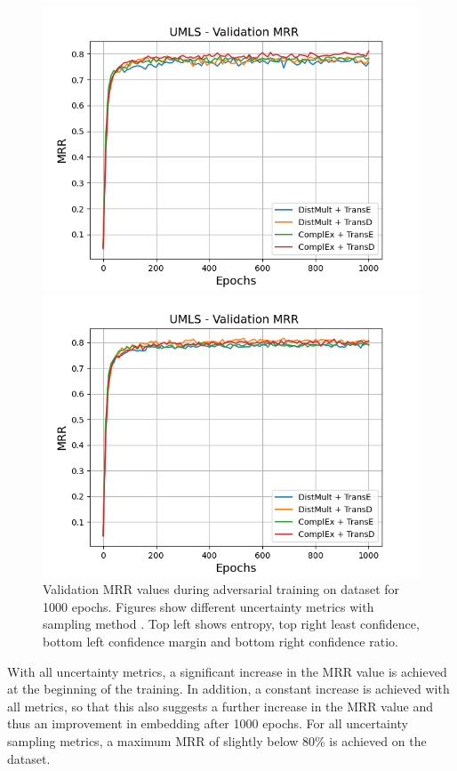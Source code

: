 \begin{figure}[H]
\begin{minipage}{.5\textwidth}
    \end{minipage}
    \begin{minipage}{.5\textwidth}
      \centering
      \includegraphics[width=0.9\linewidth]{figures/results/gan_train/not_pretrained/uncertainty/max_distribution/confidence_margin/umls/uncertainty_umls_mrrs.png}
    \end{minipage}%
    \begin{minipage}{.5\textwidth}
      \centering
      \includegraphics[width=0.9\linewidth]{figures/results/gan_train/not_pretrained/uncertainty/max_distribution/confidence_ratio/umls/uncertainty_umls_mrrs.png}
    \end{minipage}%
    \caption{Validation MRR values during adversarial training on \umls dataset for 1000 epochs. 
    Figures show different uncertainty metrics with sampling method  \ussoftmax.
    Top left shows entropy, top right least confidence, 
    bottom left confidence margin and bottom right confidence ratio.}
    \label{fig:advtrain_metrics_umls}
\end{figure}
With all uncertainty metrics, a significant increase in the MRR value is achieved at the beginning of the training.
In addition, a constant increase is achieved with all metrics, so that this also suggests a further increase in the MRR value and thus an improvement in embedding after 1000 epochs.
For all uncertainty sampling metrics, a maximum MRR of slightly below 80\% is achieved on the \umls dataset.


